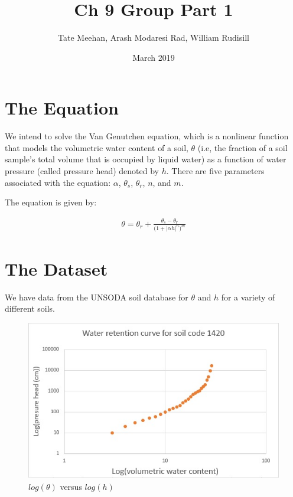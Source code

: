 \documentclass{article}
\title{Ch 9 Group Part 1}
\author{Tate Meehan, Arash Modaresi Rad, William Rudisill}
\date{March 2019}
\begin{document}
\maketitle

\section{The Equation}
We intend to solve the Van Genutchen equation, which is a nonlinear function that models the volumetric water content of a soil, $\theta$ (i.e, the fraction of a soil sample's total volume that is occupied by liquid water) as a function of water pressure (called pressure head) denoted by $h$. There are five parameters associated with the equation: $\alpha$, $\theta_s$, $\theta_r$, $n$, and $m$. 

The equation is given by:

\begin{align}
\theta = \theta_r + \frac{\theta_s - \theta_r}{\big(1 + |\alpha h|^n\big)^m}
\end{align}

\section{The Dataset}
We have data from the UNSODA soil database for $\theta$ and $h$ for a variety of different soils. 
\begin{figure}
\includegraphics[]{soil.jpg}
\caption{$log(\theta)$ versus $log(h)$}
\end{figure}
\end{document}
